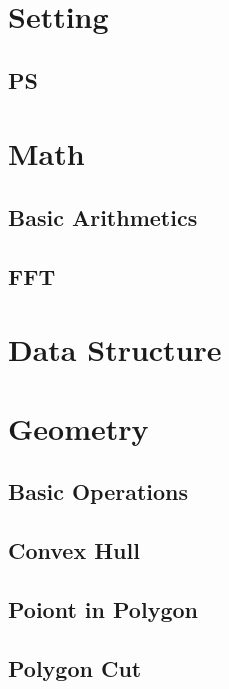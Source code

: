 \documentclass[10pt,landscape,a4paper,twocolumn]{article}
\begin{document}
\tableofcontents


\section{Setting}
\subsection{PS}


\section{Math}
\subsection{Basic Arithmetics}


\subsection{FFT}


\section{Data Structure}


\section{Geometry}
\subsection{Basic Operations}


\subsection{Convex Hull}


\subsection{Poiont in Polygon}


\subsection{Polygon Cut}

\end{document}

